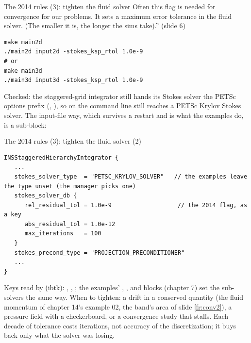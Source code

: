 \documentclass[aspectratio=169,11pt]{beamer}
\begin{document}
\begin{frame}[fragile]{The 2014 rules (3): tighten the fluid solver}
\label{fr:tol}
\footnotesize {} Often this flag is needed for convergence for our problems. It sets a maximum error tolerance in the fluid solver. (The smaller it is, the longer the sims take).'' (slide 6)
\begin{lstlisting}[style=shelltiny]
make main2d
./main2d input2d -stokes_ksp_rtol 1.0e-9
# or
make main3d
./main3d input3d -stokes_ksp_rtol 1.0e-9
\end{lstlisting}
\footnotesize Checked: the staggered-grid integrator still hands its Stokes solver the PETSc options prefix  (, ), so  on the command line still reaches a PETSc Krylov Stokes solver. The input-file way, which survives a restart and is what the examples do, is a sub-block:

\end{frame}

\begin{frame}[fragile]{The 2014 rules (3): tighten the fluid solver (2)}
\label{fr:tol2}
\begin{lstlisting}[style=inputtiny]
INSStaggeredHierarchyIntegrator {
   ...
   stokes_solver_type  = "PETSC_KRYLOV_SOLVER"   // the examples leave the type unset (the manager picks one)
   stokes_solver_db {
      rel_residual_tol = 1.0e-9                   // the 2014 flag, as a key
      abs_residual_tol = 1.0e-12
      max_iterations   = 100
   }
   stokes_precond_type = "PROJECTION_PRECONDITIONER"
   ...
}
\end{lstlisting}
\footnotesize Keys read by  (ibtk): , , ; the examples' , ,  and  blocks (chapter 7) set the sub-solvers the same way. When to tighten: a drift in a conserved quantity (the fluid momentum of chapter 14's example 02, the band's area of slide \ref{fr:conv2}), a pressure field with a checkerboard, or a convergence study that stalls. Each decade of tolerance costs iterations, not accuracy of the discretization; it buys back only what the solver was losing.
\end{frame}
\end{document}
